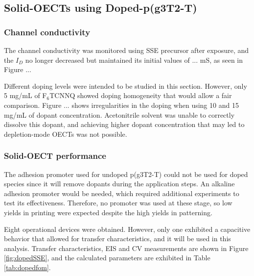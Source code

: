 \subsection{Solid-OECTs using Doped-p(g3T2-T)} \label{subsec:dopedOECTs}

\subsubsection{Channel conductivity}
The channel conductivity was monitored using SSE precursor after exposure, and the $I_{D}$ no longer decreased but maintained its initial values of ... mS, as seen in Figure ...

Different doping levels were intended to be studied in this section. However, only 5 mg/mL of F$_{6}$TCNNQ showed doping homogeneity that would allow a fair comparison. Figure ... shows irregularities in the doping when using 10 and 15 mg/mL of dopant concentration. Acetonitrile solvent was unable to correctly dissolve this dopant, and achieving higher dopant concentration that may led to depletion-mode OECTs was not possible.

\subsubsection{Solid-OECT performance}

The adhesion promoter used for undoped p(g3T2-T) could not be used for doped species since it will remove dopants during the application steps. An alkaline adhesion promoter would be needed, which required additional experiments to test its effectiveness. Therefore, no promoter was used at these stage, so low yields in printing were expected despite the high yields in patterning.

Eight operational devices were obtained. However, only one exhibited a capacitive behavior that allowed for transfer characteristics, and it will be used in this analysis. Transfer characteristics, EIS and CV measurements are shown in Figure \ref{fig:dopedSSE}, and the calculated parameters are exhibited in Table \ref{tab:dopedfom}.

